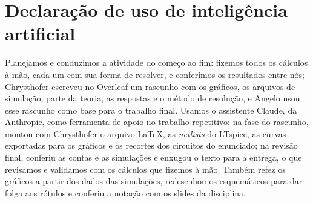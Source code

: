 \documentclass[12pt,a4paper]{report}
\begin{document}
\section*{Declaração de uso de inteligência artificial}

Planejamos e conduzimos a atividade do começo ao fim: fizemos todos os cálculos à mão, cada um com sua forma de resolver, e conferimos os resultados entre nós; Chrysthofer escreveu no Overleaf um rascunho com os gráficos, os arquivos de simulação, parte da teoria, as respostas e o método de resolução, e Angelo usou esse rascunho como base para o trabalho final. Usamos o assistente Claude, da Anthropic, como ferramenta de apoio no trabalho repetitivo: na fase do rascunho, montou com Chrysthofer o arquivo \LaTeX, as \textit{netlists} do LTspice, as curvas exportadas para os gráficos e os recortes dos circuitos do enunciado; na revisão final, conferiu as contas e as simulações e enxugou o texto para a entrega, o que revisamos e validamos com os cálculos que fizemos à mão. Também refez os gráficos a partir dos dados das simulações, redesenhou os esquemáticos para dar folga aos rótulos e conferiu a notação com os slides da disciplina.
\end{document}
